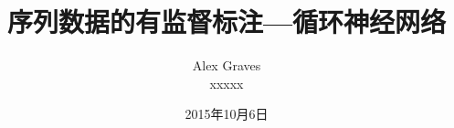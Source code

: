 \title{\li\chuhao 序列数据的有监督标注---循环神经网络}
\author{\yahei [著] Alex Graves\\\yahei [译]xxxxx}
\date{\yahei 2015年10月6日}